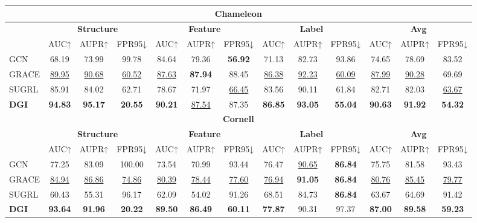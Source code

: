 \begin{table*}[!t]
{\begin{tabular}{l|ccc|ccc|ccc|ccc}
\midrule
\multicolumn{13}{c}{\textbf{Chameleon}} \\
\midrule
 & \multicolumn{3}{c|}{\textbf{Structure}} & \multicolumn{3}{c|}{\textbf{Feature}} & \multicolumn{3}{c|}{\textbf{Label}} & \multicolumn{3}{c}{\textbf{Avg}} \\
 & AUC↑ & AUPR↑ & FPR95↓ & AUC↑ & AUPR↑ & FPR95↓ & AUC↑ & AUPR↑ & FPR95↓ & AUC↑ & AUPR↑ & FPR95↓ \\
\midrule
GCN & 68.19 & 73.99 & 99.78 & 84.64 & 79.36 & \textbf{56.92} & 71.13 & 82.73 & 93.86 & 74.65 & 78.69 & 83.52 \\
GRACE & \underline{89.95} & \underline{90.68} & \underline{60.52} & \underline{87.63} & \textbf{87.94} & 88.45 & \underline{86.38} & \underline{92.23} & \underline{60.09} & \underline{87.99} & \underline{90.28} & 69.69 \\
SUGRL & 85.91 & 84.02 & 62.71 & 78.67 & 71.97 & \underline{66.45} & 83.56 & 90.11 & 61.84 & 82.71 & 82.03 & \underline{63.67} \\
\rowcolor{gray!20}
\textbf{DGI} & \textbf{94.83} & \textbf{95.17} & \textbf{20.55} & \textbf{90.21} & \underline{87.54} & 87.35 & \textbf{86.85} & \textbf{93.05} & \textbf{55.04} & \textbf{90.63} & \textbf{91.92} & \textbf{54.32} \\

\midrule
\multicolumn{13}{c}{\textbf{Cornell}} \\
\midrule
 & \multicolumn{3}{c|}{\textbf{Structure}} & \multicolumn{3}{c|}{\textbf{Feature}} & \multicolumn{3}{c|}{\textbf{Label}} & \multicolumn{3}{c}{\textbf{Avg}} \\
 & AUC↑ & AUPR↑ & FPR95↓ & AUC↑ & AUPR↑ & FPR95↓ & AUC↑ & AUPR↑ & FPR95↓ & AUC↑ & AUPR↑ & FPR95↓ \\
\midrule
GCN & 77.25 & 83.09 & 100.00 & 73.54 & 70.99 & 93.44 & 76.47 & \underline{90.65} & \textbf{86.84} & 75.75 & 81.58 & 93.43 \\
GRACE & \underline{84.94} & \underline{86.86} & \underline{74.86} & \underline{80.39} & \underline{78.44} & \underline{77.60} & \underline{76.94} & \textbf{91.05} & \textbf{86.84} & \underline{80.76} & \underline{85.45} & \underline{79.77} \\
SUGRL & 60.43 & 55.31 & 96.17 & 62.09 & 54.02 & 91.26 & 68.51 & 84.73 & \textbf{86.84} & 63.67 & 64.69 & 91.42 \\
\rowcolor{gray!20}
\textbf{DGI} & \textbf{93.64} & \textbf{91.96} & \textbf{20.22} & \textbf{89.50} & \textbf{86.49} & \textbf{60.11} & \textbf{77.87} & 90.31 & 97.37 & \textbf{87.00} & \textbf{89.58} & \textbf{59.23} \\

\bottomrule
\end{tabular}

}

\end{table*}